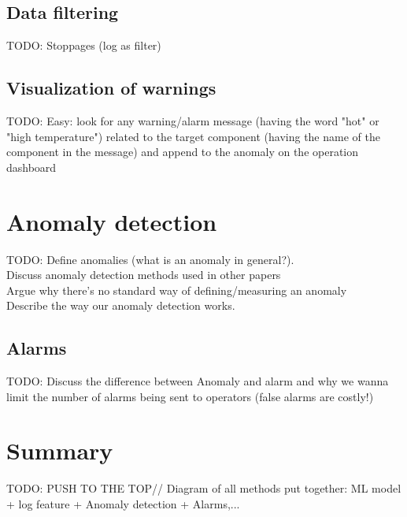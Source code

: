 \subsection{Data filtering}
  TODO:
  Stoppages (log as filter)

\subsection{Visualization of warnings}
  TODO:
  Easy: look for any warning/alarm message (having the word "hot" or "high temperature") related to the target component (having the name of the component in the message) 
  and append to the anomaly on the operation dashboard

\section{Anomaly detection}
  TODO:
  Define anomalies (what is an anomaly in general?).\\
  Discuss anomaly detection methods used in other papers\\
  Argue why there's no standard way of defining/measuring an anomaly\\
  Describe the way our anomaly detection works.

\subsection{Alarms}
  TODO:
  Discuss the difference between Anomaly and alarm and why we wanna limit the number of alarms being sent to operators (false alarms are costly!)

\section{Summary}
TODO:
PUSH TO THE TOP//
Diagram of all methods put together: ML model + log feature + Anomaly detection + Alarms,...